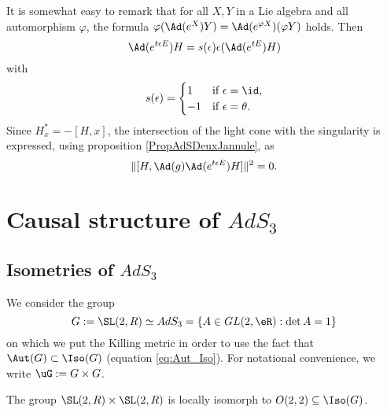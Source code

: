 It is somewhat easy to remark that for all $X,Y$ in a Lie algebra and all automorphism $\varphi$, the formula $\varphi(\Ad(e^X)Y)=\Ad(e^{\varphi X})(\varphi Y)$ holds. Then
\begin{equation}
\Ad(e^{t\epsilon E})H=s(\epsilon)\epsilon(\Ad(e^{tE})H)
\end{equation}
with
\[
  s(\epsilon)=
\begin{cases}
1&\text{if $\epsilon=\id$},\\
-1&\text{if $\epsilon=\theta$}.
\end{cases}
\]
Since $H^*_x=-[H,x]$, the intersection of the light cone with the singularity is expressed, using proposition \ref{PropAdSDeuxJannule}, as
\begin{equation}
    \|[H,\Ad(g)\Ad(e^{t\epsilon E})H]\|^2=0.
\end{equation}

\section{Causal structure of \texorpdfstring{$AdS_3$}{AdS3}}

\subsection{Isometries of \texorpdfstring{$AdS_3$}{AdS3}}

We consider the group
\[
   G:=\SL(2,R)\simeq AdS_3=\{A\in GL(2,\eR):\det A=1\}
\]
on which we put the Killing metric in order to use the fact that $\Aut(G)\subset\Iso(G)$ (equation \eqref{eq:Aut_Iso}). For notational convenience, we write $\uG:=G\times G$.

\begin{lemma}
The group $\SL(2,R)\times\SL(2,R)$ is locally isomorph to $O(2,2)\subseteq \Iso(G)$.
\end{lemma}

